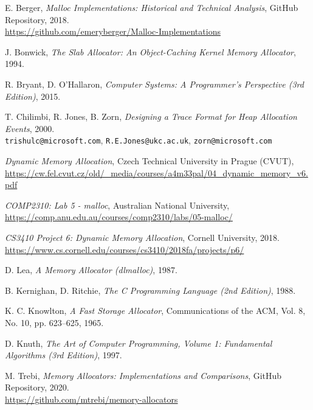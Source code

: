 \begin{thebibliography}{9}

  E. Berger, \emph{Malloc Implementations: Historical and Technical Analysis}, GitHub Repository, 2018. \\
  \url{https://github.com/emeryberger/Malloc-Implementations}

  J. Bonwick, \emph{The Slab Allocator: An Object-Caching Kernel Memory Allocator}, 1994.

  R. Bryant, D. O’Hallaron, \emph{Computer Systems: A Programmer’s Perspective (3rd Edition)}, 2015.

  T. Chilimbi, R. Jones, B. Zorn, \emph{Designing a Trace Format for Heap Allocation Events}, 2000. \\
  \texttt{trishulc@microsoft.com}, \texttt{R.E.Jones@ukc.ac.uk}, \texttt{zorn@microsoft.com}

  \emph{Dynamic Memory Allocation}, Czech Technical University in Prague (CVUT), \\
  \url{https://cw.fel.cvut.cz/old/_media/courses/a4m33pal/04_dynamic_memory_v6.pdf}

  \emph{COMP2310: Lab 5 - malloc}, Australian National University, \\
  \url{https://comp.anu.edu.au/courses/comp2310/labs/05-malloc/}

  \emph{CS3410 Project 6: Dynamic Memory Allocation}, Cornell University, 2018. \\
  \url{https://www.cs.cornell.edu/courses/cs3410/2018fa/projects/p6/}

  D. Lea, \emph{A Memory Allocator (dlmalloc)}, 1987.

  B. Kernighan, D. Ritchie, \emph{The C Programming Language (2nd Edition)}, 1988.

  K. C. Knowlton, \emph{A Fast Storage Allocator}, Communications of the ACM, Vol. 8, No. 10, pp. 623–625, 1965.

  D. Knuth, \emph{The Art of Computer Programming, Volume 1: Fundamental Algorithms (3rd Edition)}, 1997.

  M. Trebi, \emph{Memory Allocators: Implementations and Comparisons}, GitHub Repository, 2020. \\
  \url{https://github.com/mtrebi/memory-allocators}


\end{thebibliography}
